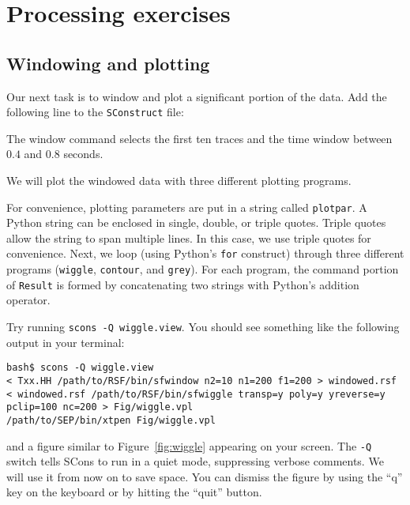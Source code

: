 \section{Processing exercises}

\subsection{Windowing and plotting}

Our next task is to window and plot a significant portion of the data. Add the
following line to the \texttt{SConstruct} file:



The window command selects the first ten traces and the time window between
$0.4$ and $0.8$ seconds.

We will plot the windowed data with three different plotting programs.



For convenience, plotting parameters are put in a string called
\texttt{plotpar}. A Python string can be enclosed in single, double, or triple
quotes. Triple quotes allow the string to span multiple lines. In this case,
we use triple quotes for convenience. Next, we loop (using Python's
\texttt{for} construct) through three different programs (\texttt{wiggle},
\texttt{contour}, and \texttt{grey}). For each program, the command portion of
\texttt{Result} is formed by concatenating two strings with Python's addition
operator.

Try running \texttt{scons -Q wiggle.view}. You should see something like the
following output in your terminal:
\begin{verbatim}
bash$ scons -Q wiggle.view
< Txx.HH /path/to/RSF/bin/sfwindow n2=10 n1=200 f1=200 > windowed.rsf
< windowed.rsf /path/to/RSF/bin/sfwiggle transp=y poly=y yreverse=y 
pclip=100 nc=200 > Fig/wiggle.vpl
/path/to/SEP/bin/xtpen Fig/wiggle.vpl
\end{verbatim}
and a figure similar to Figure~\ref{fig:wiggle} appearing on your screen. The \texttt{-Q} switch tells SCons to run in a quiet mode,
suppressing verbose comments. We will use it from now on to save space. You
can dismiss the figure by using the ``q'' key on the keyboard or by hitting
the ``quit'' button. 

